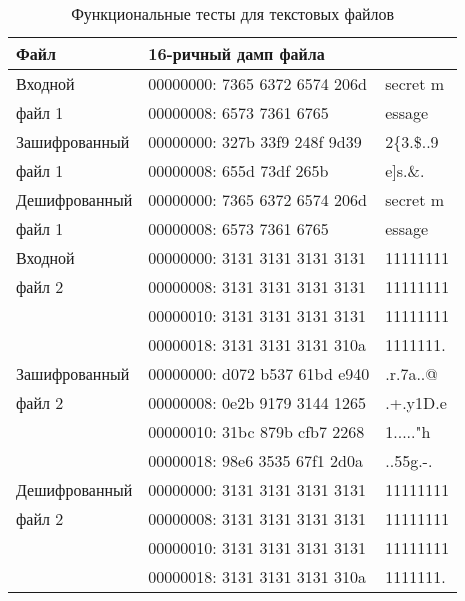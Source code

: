 \begin{table}[ht!]
	\begin{center}
		\caption{Функциональные тесты для текстовых файлов}
        \label{tbl:test}
		\begin{tabular}{|l|ll|}
            \hline
            Файл & 16-ричный дамп файла & \\
			\hline
			\hline
            Входной       & 00000000: 7365 6372 6574 206d & secret m \\
            файл 1        & 00000008: 6573 7361 6765      & essage \\
			\hline
            Зашифрованный & 00000000: 327b 33f9 248f 9d39 & 2\{3.\$..9 \\
            файл 1        & 00000008: 655d 73df 265b      & e]s.\&. \\
            \hline
            Дешифрованный & 00000000: 7365 6372 6574 206d & secret m \\
            файл 1        & 00000008: 6573 7361 6765      & essage \\
			\hline
            \hline
            Входной       & 00000000: 3131 3131 3131 3131 & 11111111 \\
            файл 2        & 00000008: 3131 3131 3131 3131 & 11111111 \\
                          & 00000010: 3131 3131 3131 3131 & 11111111 \\
                          & 00000018: 3131 3131 3131 310a & 1111111. \\
            \hline
            Зашифрованный & 00000000: d072 b537 61bd e940 & .r.7a..@ \\
            файл 2        & 00000008: 0e2b 9179 3144 1265 & .+.y1D.e \\
                          & 00000010: 31bc 879b cfb7 2268 & 1....."h \\
                          & 00000018: 98e6 3535 67f1 2d0a & ..55g.-. \\
            \hline
            Дешифрованный & 00000000: 3131 3131 3131 3131 & 11111111 \\
            файл 2        & 00000008: 3131 3131 3131 3131 & 11111111 \\
                          & 00000010: 3131 3131 3131 3131 & 11111111 \\
                          & 00000018: 3131 3131 3131 310a & 1111111. \\
            \hline
		\end{tabular}
	\end{center}
\end{table}

